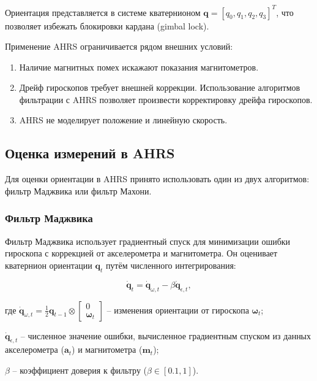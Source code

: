 Ориентация представляется в системе кватернионом \(\mathbf{q} = [q_0, q_1, q_2, q_3]^T\), что позволяет
избежать блокировки кардана (gimbal lock).

Применение AHRS ограничивается рядом внешних условий:

\begin{enumerate}[label=\arabic*]
    \item Наличие магнитных помех искажают показания магнитометров.
    \item Дрейф гироскопов требует внешней коррекции. Использование алгоритмов фильтрации
	    с AHRS позволяет произвести корректировку дрейфа гироскопов.
    \item AHRS не моделирует положение и линейную скорость.
\end{enumerate}

\subsection{Оценка измерений в AHRS}

Для оценки ориентации в AHRS принято использовать один из двух алгоритмов: фильтр Маджвика или фильтр Махони.

\subsubsection{Фильтр Маджвика}

Фильтр Маджвика использует градиентный спуск для минимизации ошибки гироскопа 
с коррекцией от акселерометра и магнитометра. Он оценивает кватернион ориентации
\(\mathbf{q}_t\) путём численного интегрирования:

\begin{equation}
    \dot{\mathbf{q}}_t = \dot{\mathbf{q}}_{\omega, t} - \beta \dot{\mathbf{q}}_{\epsilon, t},
\end{equation}

\begin{explanationx}
\item[где] \(\dot{\mathbf{q}}_{\omega, t} = \frac{1}{2} \mathbf{q}_{t-1} \otimes \begin{bmatrix} 0 \\ 
\boldsymbol{\omega}_t \end{bmatrix}\) -- изменения ориентации от гироскопа \(\boldsymbol{\omega}_t\);
\item \(\dot{\mathbf{q}}_{\epsilon, t}\) -- 
	численное значение ошибки, вычисленное градиентным спуском из данных акселерометра 
	(\(\mathbf{a}_t\)) и магнитометра (\(\mathbf{m}_t\));
\item \(\beta\) -- коэффициент доверия к фильтру ($\beta \in [0.1, 1]$).
\end{explanationx}

